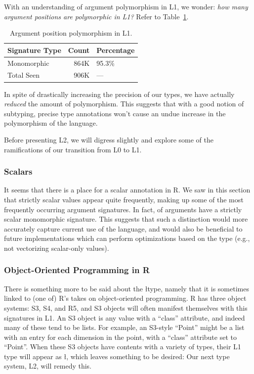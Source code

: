 \documentclass[acmsmall,10pt,review,anonymous]{acmart}\settopmatter{printfolios=true,printccs=false,printacmref=false}
\begin{document}
With an understanding of argument polymorphism in L1, we wonder: {\it how many argument positions are polymorphic in L1?}
Refer to Table~\ref{tab:argcountsL1}.

\begin{table}[ht]
\centering
\begin{tabular}{lrl}
  \hline
Signature Type & Count & Percentage \\ 
  \hline
Monomorphic & 864K & 95.3\% \\ 
  Total Seen & 906K & --- \\ 
   \hline
\end{tabular}
\caption{Argument position polymorphism in L1.}
\label{tab:argcountsL1}
\end{table}

In spite of drastically increasing the precision of our types, we have actually {\it reduced} the amount of polymorphism.
This suggests that with a good notion of subtyping, precise type annotations won't cause an undue increase in the polymorphism of the language.

Before presenting L2, we will digress slightly and explore some of the ramifications of our transition from L0 to L1.

%
%
\subsubsection{Scalars}
\label{sec:scalars}

It seems that there is a place for a scalar annotation in R.
We saw in this section that strictly scalar values appear quite frequently, making up some of the most frequently occurring argument signatures.
In fact, \PERCSCALARMONO of arguments have a strictly scalar monomorphic signature.
This suggests that such a distinction would more accurately capture current use of the language, and would also be beneficial to future implementations which can perform optimizations based on the type (e.g., not vectorizing scalar-only values).

%
%
\subsubsection{Object-Oriented Programming in R}
\label{sec:S3S4R5}

There is something more to be said about the \l type, namely that it is sometimes linked to (one of) R's takes on object-oriented programming.
R has three object systems: S3, S4, and R5, and S3 objects will often manifest themselves with this signatures in L1.
An S3 object is any value with a ``class'' attribute, and indeed many of these tend to be lists.
For example, an S3-style ``Point'' might be a list with an entry for each dimension in the point, with a ``class'' attribute set to ``Point''.
When these S3 objects have contents with a variety of types, their L1 type will appear as \l, which leaves something to be desired:
Our next type system, L2, will remedy this.
\end{document}
